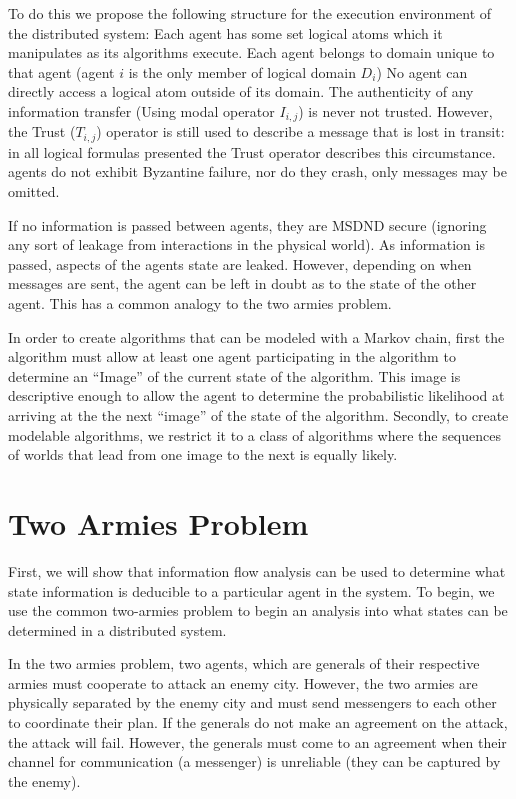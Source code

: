 To do this we propose the following structure for the execution environment of the distributed system:
Each agent has some set logical atoms which it manipulates as its algorithms execute.
Each agent belongs to domain unique to that agent (agent $i$ is the only member of logical domain $D_i$)
No agent can directly access a logical atom outside of its domain.
The authenticity of any information transfer (Using modal operator $I_{i,j}$) is never not trusted. However, the Trust ($T_{i,j}$) operator is still used to describe a message that is lost in transit: in all logical formulas presented the Trust operator describes this circumstance.
agents do not exhibit Byzantine failure, nor do they crash, only messages may be omitted.

If no information is passed between agents, they are MSDND secure (ignoring any sort of leakage from interactions in the physical world). As information is passed, aspects of the agents state are leaked. However, depending on when messages are sent, the agent can be left in doubt as to the state of the other agent. This has a common analogy to the two armies problem. 

In order to create algorithms that can be modeled with a Markov chain, first the algorithm must allow at least one agent participating in the algorithm to determine an ``Image'' of the current state of the algorithm. This image is descriptive enough to allow the agent to determine the probabilistic likelihood at arriving at the the next ``image'' of the state of the algorithm. Secondly, to create modelable algorithms, we restrict it to a class of algorithms where the sequences of worlds that lead from one image to the next is equally likely.

\section{Two Armies Problem}

First, we will show that information flow analysis can be used to determine what state information is deducible to a particular agent in the system. To begin, we use the common two-armies problem to begin an analysis into what states can be determined in a distributed system.

In the two armies problem, two agents, which are generals of their respective armies must cooperate to attack an enemy city. However, the two armies are physically separated by the enemy city and must send messengers to each other to coordinate their plan. If the generals do not make an agreement on the attack, the attack will fail. However, the generals must come to an agreement when their channel for communication (a messenger) is unreliable (they can be captured by the enemy).

